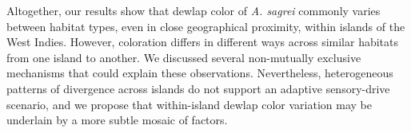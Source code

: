 Altogether, our results show that dewlap color of \textit{A. sagrei} commonly varies between habitat types, even in close geographical proximity, within islands of the West Indies. However, coloration differs in different ways across similar habitats from one island to another. We discussed several non-mutually exclusive mechanisms that could explain these observations. Nevertheless, heterogeneous patterns of divergence across islands do not support an adaptive sensory-drive scenario, and we propose that within-island dewlap color variation may be underlain by a more subtle mosaic of factors.